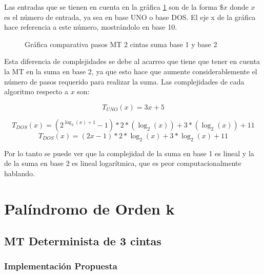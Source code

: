 \documentclass{uc3mpracticas}
\begin{document}
  \vspace{2mm}

  Las entradas que se tienen en cuenta en la gráfica \ref{fig:comparativaEJ1y2} son de la forma $\$x$ donde $x$ es el número de entrada, ya sea en base UNO o base DOS. El eje x de la gráfica hace referencia a este número, mostrándolo en base 10.



  \begin{figure}[!h]
    \caption{Gráfica comparativa pasos MT 2 cintas suma base 1 y base 2}
    \label{fig:comparativaEJ1y2}
  \end{figure}


  Esta diferencia de complejidades se debe al acarreo que tiene que tener en cuenta la MT en la suma en base 2, ya que esto hace que aumente considerablemente el número de pasos requerido para realizar la suma. Las complejidades de cada algoritmo respecto a $x$ son:

  $$ T_{UNO}(x) = 3x + 5 $$

  $$ T_{DOS}(x) = (2^{\log_2(x)+1} - 1) * 2*(\log_2(x))+ 3*(\log_2(x)) + 11  $$
  $$ T_{DOS}(x) = (2x - 1) * 2*\log_2(x) + 3*\log_2(x) + 11  $$


  Por lo tanto se puede ver que la complejidad de la suma en base 1 es lineal y la de la suma en base 2 es lineal logarítmica, que es peor computacionalmente hablando.



  \clearpage


  \section{Palíndromo de Orden k}

  \subsection{MT Determinista de 3 cintas}


  \subsubsection{Implementación Propuesta}
\end{document}
